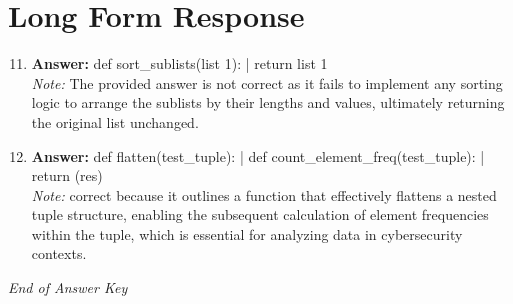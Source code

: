 \documentclass[12pt]{article}
\begin{document}
\section*{Long Form Response}
\begin{enumerate}[label=\arabic*.]
\setcounter{enumi}{10}
\item \textbf{Answer:} def sort\_sublists(list 1): | return list 1
\\ \textit{Note:} The provided answer is not correct as it fails to implement any sorting logic to arrange the sublists by their lengths and values, ultimately returning the original list unchanged.
\item \textbf{Answer:} def flatten(test\_tuple): | def count\_element\_freq(test\_tuple): | return (res)
\\ \textit{Note:} correct because it outlines a function that effectively flattens a nested tuple structure, enabling the subsequent calculation of element frequencies within the tuple, which is essential for analyzing data in cybersecurity contexts.
\end{enumerate}

\vfill
\noindent\textit{End of Answer Key}
\end{document}
